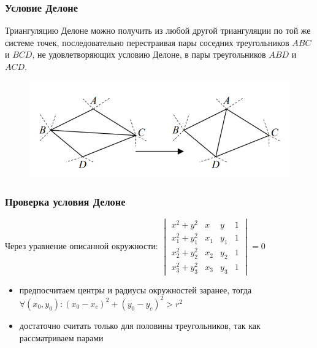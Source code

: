\documentclass[notheorems,aspectratio=169]{beamer}
\begin{document}
\begin{frame}\frametitle{Условие Делоне}
	Триангуляцию Делоне можно получить из любой другой триангуляции по той же системе точек, 
	последовательно перестраивая пары соседних треугольников $ABC$ и $BCD$, не удовлетворяющих условию
	Делоне, в пары треугольников $ABD$ и $ACD$.
	\begin{figure}
		\includegraphics[height=0.5\textheight, keepaspectratio]{delone1.png}
	\end{figure}
\end{frame}

\begin{frame}\frametitle{Проверка условия Делоне}
	Через уравнение описанной окружности:
	$
	\begin{vmatrix}
	x^2+y^2& x& y& 1\\
	x_1^2+y_1^2& x_1& y_1& 1\\
	x_2^2+y_2^2& x_2& y_2& 1\\
	x_3^2+y_3^2& x_3& y_3& 1
	\end{vmatrix}
	= 0$
	
	\begin{itemize}
		\item предпосчитаем центры и радиусы окружностей заранее, тогда 
		$\forall (x_0, y_0): (x_0 - x_c)^2+(y_0-y_c)^2>r^2$
		\item достаточно считать только для половины треугольников, так как рассматриваем парами
	\end{itemize}
\end{frame}
\end{document}
